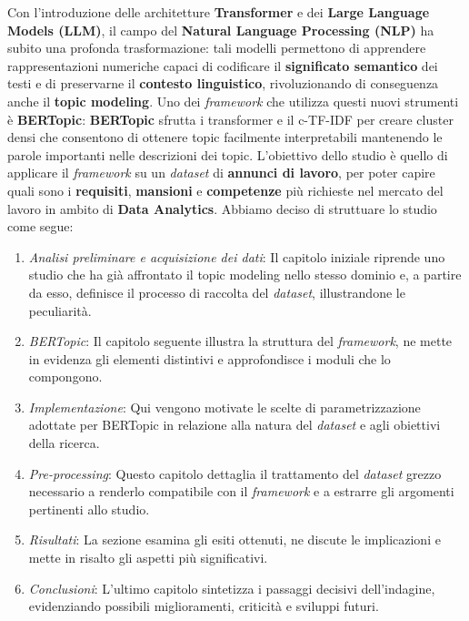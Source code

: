 Con l’introduzione delle architetture \textbf{Transformer} e dei \textbf{Large Language Models (LLM)}, il campo del \textbf{Natural Language Processing (NLP)} ha subito una profonda trasformazione: tali modelli permettono di apprendere rappresentazioni numeriche capaci di codificare il \textbf{significato semantico} dei testi e di preservarne il \textbf{contesto linguistico}, rivoluzionando di conseguenza anche il \textbf{topic modeling}.
Uno dei \textit{framework} che utilizza questi nuovi strumenti è \textbf{BERTopic}:
\textbf{BERTopic} sfrutta i transformer e il c-TF-IDF per creare cluster densi che consentono di ottenere topic facilmente interpretabili mantenendo le parole importanti nelle descrizioni dei topic.
L'obiettivo dello studio è quello di applicare il \textit{framework} su un \textit{dataset} di \textbf{annunci di lavoro}, per poter capire quali sono i \textbf{requisiti}, \textbf{mansioni} e \textbf{competenze} più richieste nel mercato del lavoro in ambito di \textbf{Data Analytics}.
Abbiamo deciso di struttuare lo studio come segue:
\begin{enumerate}
    \item \textit{Analisi preliminare e acquisizione dei dati}: Il capitolo iniziale riprende uno studio che ha già affrontato il topic modeling nello stesso dominio e, a partire da esso, definisce il processo di raccolta del \textit{dataset}, illustrandone le peculiarità.
    \item \textit{BERTopic}: Il capitolo seguente illustra la struttura del \textit{framework}, ne mette in evidenza gli elementi distintivi e approfondisce i moduli che lo compongono.
    \item \textit{Implementazione}: Qui vengono motivate le scelte di parametrizzazione adottate per BERTopic in relazione alla natura del \textit{dataset} e agli obiettivi della ricerca.
    \item \textit{Pre-processing}: Questo capitolo dettaglia il trattamento del \textit{dataset} grezzo necessario a renderlo compatibile con il \textit{framework} e a estrarre gli argomenti pertinenti allo studio.
    \item \textit{Risultati}: La sezione esamina gli esiti ottenuti, ne discute le implicazioni e mette in risalto gli aspetti più significativi.
    \item \textit{Conclusioni}: L'ultimo capitolo sintetizza i passaggi decisivi dell'indagine, evidenziando possibili miglioramenti, criticità e sviluppi futuri.
\end{enumerate}